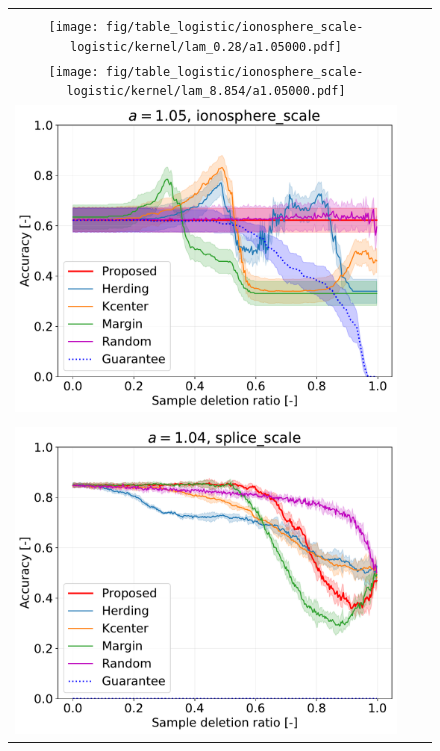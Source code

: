 \begin{figure}[h]
\begin{tabular}{ccc}
		\\
		\begin{minipage}[b]{0.3\hsize}\centering {\small Dataset: ionosphere, $\lambda=\lambda_\mathrm{best}$}\\\texttt{[image: fig/table\_logistic/ionosphere\_scale-logistic/kernel/lam\_0.28/a1.05000.pdf]}\end{minipage}
		&
		\begin{minipage}[b]{0.3\hsize}\centering {\small Dataset: ionosphere, $\lambda=n \cdot 10^{-1.5}$}\\\texttt{[image: fig/table\_logistic/ionosphere\_scale-logistic/kernel/lam\_8.854/a1.05000.pdf]}\end{minipage}
		&
		\begin{minipage}[b]{0.3\hsize}\centering {\small Dataset: ionosphere, $\lambda=n$}\\\includegraphics[width=0.8\hsize]{fig/table_logistic/ionosphere_scale-logistic/kernel/lam_280/a1.05000.pdf}\end{minipage}
		\\
		\begin{minipage}[b]{0.3\hsize}\centering {\small Dataset: splice, $\lambda=\lambda_\mathrm{best}$}\\\includegraphics[width=0.8\hsize]{fig/table_logistic/splice_scale-logistic/kernel/lam_0.03/a1.04000.pdf}\end{minipage}

\end{tabular}
\end{figure}
